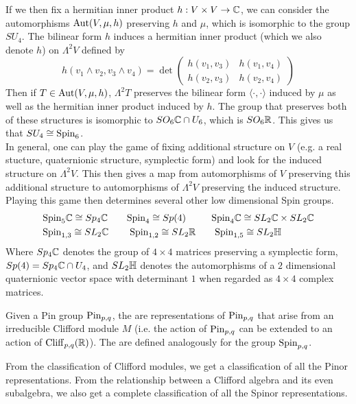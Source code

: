 If we then fix a hermitian inner product $h : V \times V \to \mathbb{C}$, we can
consider the automorphisms $\operatorname{Aut}(V, \mu, h)$ preserving $h$ and $\mu$, which
is isomorphic to the group $SU_4$. The bilinear form $h$ induces a hermitian
inner product (which we also denote $h$) on $\Lambda^2V$ defined by
\[
h(v_1 \wedge v_2, v_3 \wedge v_4) = \det \begin{pmatrix}
h(v_1,v_3) & h(v_1, v_4) \\
h(v_2,v_3) & h(v_2,v_4)
\end{pmatrix}
\]
Then if $T \in \operatorname{Aut}(V,\mu,h)$, $\Lambda^2T$ preserves the bilinear form
$\langle\cdot,\cdot\rangle$ induced by $\mu$ as well as the hermitian inner
product induced by $h$. The group that preserves both of these structures
is isomorphic to $SO_6\mathbb{C} \cap U_6$, which is $SO_6\mathbb{R}$. This gives us that
$SU_4 \cong \mathrm{Spin}_6$. \\

In general, one can play the game of fixing additional structure on $V$
(e.g. a real stucture, quaternionic structure, symplectic form) and look
for the induced structure on $\Lambda^2V$. This then gives a map from
automorphisms of $V$ preserving this additional structure to automorphisms
of $\Lambda^2V$ preserving the induced structure. Playing this game then
determines several other low dimensional Spin groups.
%
\begin{align*}
&\mathrm{Spin}_5\mathbb{C} \cong Sp_4\mathbb{C} \qquad\mathrm{Spin}_4 \cong Sp(4) \qquad\:\:\:\mathrm{Spin}_4\mathbb{C} \cong SL_2\mathbb{C} \times
SL_2\mathbb{C} \\
&\mathrm{Spin}_{1,3} \cong SL_2\mathbb{C} \qquad\: \mathrm{Spin}_{1,2} \cong SL_2\mathbb{R} \qquad\mathrm{Spin}_{1,5} \cong SL_2\mathbb{H}
\end{align*}
%
Where $Sp_4\mathbb{C}$ denotes the group of $4\times4$ matrices preserving a symplectic
form, $Sp(4) = Sp_4\mathbb{C} \cap U_4$, and $SL_2\mathbb{H}$ denotes the automorphisms of a
$2$ dimensional quaternionic vector space with determinant $1$ when regarded
as $4 \times 4$ complex matrices.
%
\begin{defn}
Given a Pin group $\mathrm{Pin}_{p,q}$, the  are representations
of $\mathrm{Pin}_{p,q}$ that arise from an irreducible Clifford module $M$ (i.e. the
action of $\mathrm{Pin}_{p,q}$ can be extended to an action of $\operatorname{Cliff}_{p,q}(\mathbb{R})$). The
 are defined analogously for the group $\mathrm{Spin}_{p,q}$.
\end{defn}
%
From the classification of Clifford modules, we get a classification of
all the Pinor representations. From the relationship between a Clifford
algebra and its even subalgebra, we also get a complete classification of all
the Spinor representations.
%
